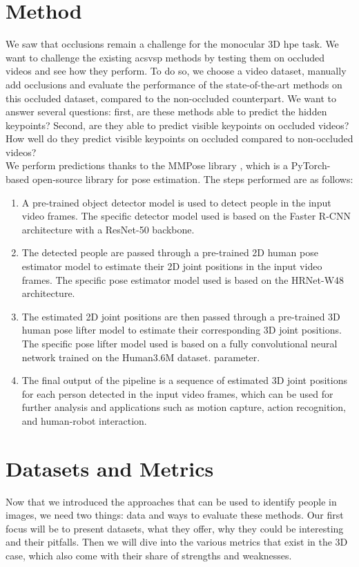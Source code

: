 \documentclass[runningheads]{llncs}
\begin{document}
\section{Method}
We saw that occlusions remain a challenge for the monocular 3D \ac{hpe} task. We want to challenge the existing ac{svsp} methods by testing them on occluded videos and see how they perform. To do so, we choose a video dataset, manually add occlusions and evaluate the performance of the state-of-the-art methods on this occluded dataset, compared to the non-occluded counterpart. We want to answer several questions: first, are these methods able to predict the hidden keypoints? Second, are they able to predict visible keypoints on occluded videos? How well do they predict visible keypoints on occluded compared to non-occluded videos? \\
We perform predictions thanks to the MMPose library \cite{mmpose}, which is a PyTorch-based open-source library for pose estimation. The steps performed are as follows:
\begin{enumerate}
  \item A pre-trained object detector model is used to detect people in the input video frames. The specific detector model used is based on the Faster R-CNN architecture \cite{faster RCNN} with a ResNet-50 backbone.
  \item The detected people are passed through a pre-trained 2D human pose estimator model to estimate their 2D joint positions in the input video frames. The specific pose estimator model used is based on the HRNet-W48 architecture.
  \item The estimated 2D joint positions are then passed through a pre-trained 3D human pose lifter model to estimate their corresponding 3D joint positions. The specific pose lifter model used is based on a fully convolutional neural network trained on the Human3.6M dataset. parameter.
  \item The final output of the pipeline is a sequence of estimated 3D joint positions for each person detected in the input video frames, which can be used for further analysis and applications such as motion capture, action recognition, and human-robot interaction.
\end{enumerate}





\section{Datasets and Metrics}
Now that we introduced the approaches that can be used to identify people in images, we need two things: data and ways to evaluate these methods. Our first focus will be to present datasets, what they offer, why they could be interesting and their pitfalls. Then we will dive into the various metrics that exist in the 3D case, which also come with their share of strengths and weaknesses.
\end{document}
